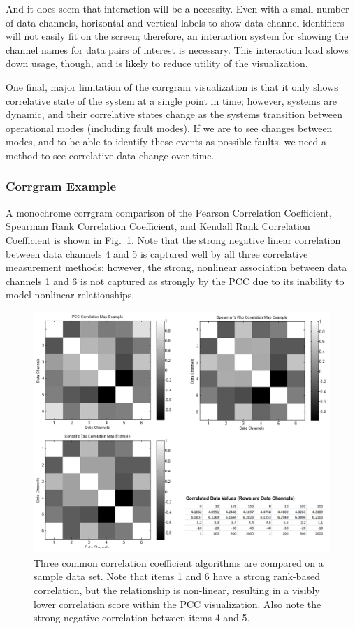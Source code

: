 And it does seem that interaction will be a necessity. Even with a small number of data channels, horizontal and vertical labels to show data channel identifiers will not easily fit on the screen; therefore, an interaction system for showing the channel names for data pairs of interest is necessary. This interaction load slows down usage, though, and is likely to reduce utility of the visualization.

One final, major limitation of the corrgram visualization is that it only shows correlative state of the system at a single point in time; however, systems are dynamic, and their correlative states change as the systems transition between operational modes (including fault modes). If we are to see changes between modes, and to be able to identify these events as possible faults, we need a method to see correlative data change over time.

\subsubsection{Corrgram Example}

A monochrome corrgram comparison of the Pearson Correlation Coefficient, Spearman Rank Correlation Coefficient, and Kendall Rank Correlation Coefficient is shown in Fig.~\ref{fig:correlation_comparison}. Note that the strong negative linear correlation between data channels 4 and 5 is captured well by all three correlative measurement methods; however, the strong, nonlinear association between data channels 1 and 6 is not captured as strongly by the PCC due to its inability to model nonlinear relationships.

\begin{figure}[h]
\centering
    \includegraphics[width=\columnwidth]{images/correlation_comparison.png}
    \caption{Three common correlation coefficient algorithms are compared on a sample data set. Note that items 1 and 6 have a strong rank-based correlation, but the relationship is non-linear, resulting in a visibly lower correlation score within the PCC visualization. Also note the strong negative correlation between items 4 and 5.}
    \label{fig:correlation_comparison}
\end{figure}

